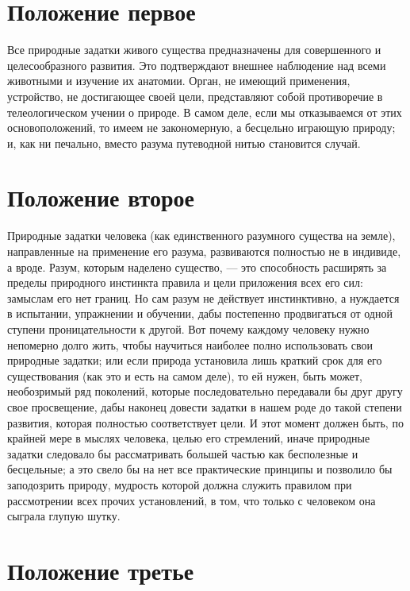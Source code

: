 \documentclass[a4paper]{book}
\begin{document}
\section{Положение первое}

Все природные задатки живого существа предназначены для совершенного и целесообразного развития. Это подтверждают внешнее наблюдение над всеми животными и изучение их анатомии. Орган, не имеющий применения, устройство, не достигающее своей цели, представляют собой противоречие в телеологическом учении о природе. В самом деле, если мы отказываемся от этих основоположений, то имеем не закономерную, а бесцельно играющую природу; и, как ни печально, вместо разума путеводной нитью становится случай.

\section{Положение второе}

Природные задатки человека (как единственного разумного существа на земле), направленные на применение его разума, развиваются полностью не в индивиде, а вроде. Разум, которым наделено существо, — это способность расширять за пределы природного инстинкта правила и цели приложения всех его сил: замыслам его нет границ. Но сам разум не действует инстинктивно, а нуждается в испытании, упражнении и обучении, дабы постепенно продвигаться от одной ступени проницательности к другой. Вот почему каждому человеку нужно непомерно долго жить, чтобы научиться наиболее полно использовать свои природные задатки; или если природа установила лишь краткий срок для его существования (как это и есть на самом деле), то ей нужен, быть может, необозримый ряд поколений, которые последовательно передавали бы друг другу свое просвещение, дабы наконец довести задатки в нашем роде до такой степени развития, которая полностью соответствует цели. И этот момент должен быть, по крайней мере в мыслях человека, целью его стремлений, иначе природные задатки следовало бы рассматривать большей частью как бесполезные и бесцельные; а это свело бы на нет все практические принципы и позволило бы заподозрить природу, мудрость которой должна служить правилом при рассмотрении всех прочих установлений, в том, что только с человеком она сыграла глупую шутку.

\section{Положение третье}
\end{document}

